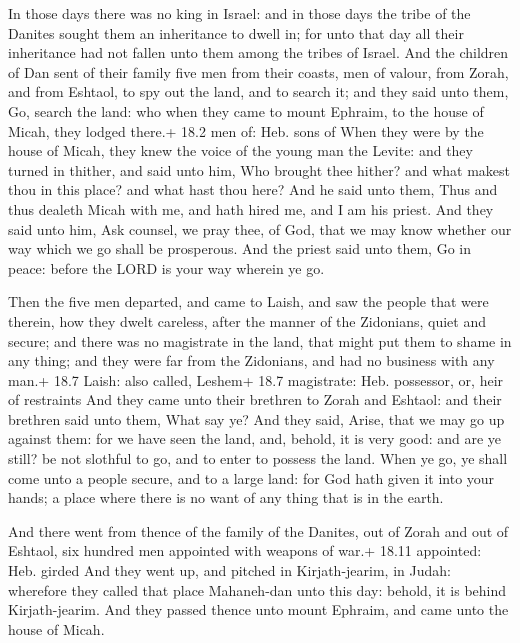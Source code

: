  In those days there was no king in Israel: and in those
days the tribe of the Danites sought them an inheritance to dwell in;
for unto that day all their inheritance had not fallen unto them among
the tribes of Israel.  And the children of Dan sent of their
family five men from their coasts, men of valour, from Zorah, and from
Eshtaol, to spy out the land, and to search it; and they said unto them,
Go, search the land: who when they came to mount Ephraim, to the house
of Micah, they lodged there.+ 18.2 men of: Heb. sons of 
When they were by the house of Micah, they knew the voice of the young
man the Levite: and they turned in thither, and said unto him, Who
brought thee hither? and what makest thou in this place? and what hast
thou here?  And he said unto them, Thus and thus dealeth
Micah with me, and hath hired me, and I am his priest.  And
they said unto him, Ask counsel, we pray thee, of God, that we may know
whether our way which we go shall be prosperous.  And the
priest said unto them, Go in peace: before the LORD is your way wherein
ye go.

 Then the five men departed, and came to Laish, and saw
the people that were therein, how they dwelt careless, after the manner
of the Zidonians, quiet and secure; and there was no magistrate in the
land, that might put them to shame in any thing; and they were far from
the Zidonians, and had no business with any man.+ 18.7 Laish: also
called, Leshem+ 18.7 magistrate: Heb. possessor, or, heir of restraints
 And they came unto their brethren to Zorah and Eshtaol: and
their brethren said unto them, What say ye?  And they said,
Arise, that we may go up against them: for we have seen the land, and,
behold, it is very good: and are ye still? be not slothful to go, and to
enter to possess the land.  When ye go, ye shall come unto
a people secure, and to a large land: for God hath given it into your
hands; a place where there is no want of any thing that is in the earth.

 And there went from thence of the family of the Danites,
out of Zorah and out of Eshtaol, six hundred men appointed with weapons
of war.+ 18.11 appointed: Heb. girded  And they went up,
and pitched in Kirjath-jearim, in Judah: wherefore they called that
place Mahaneh-dan unto this day: behold, it is behind Kirjath-jearim.
 And they passed thence unto mount Ephraim, and came unto
the house of Micah.

